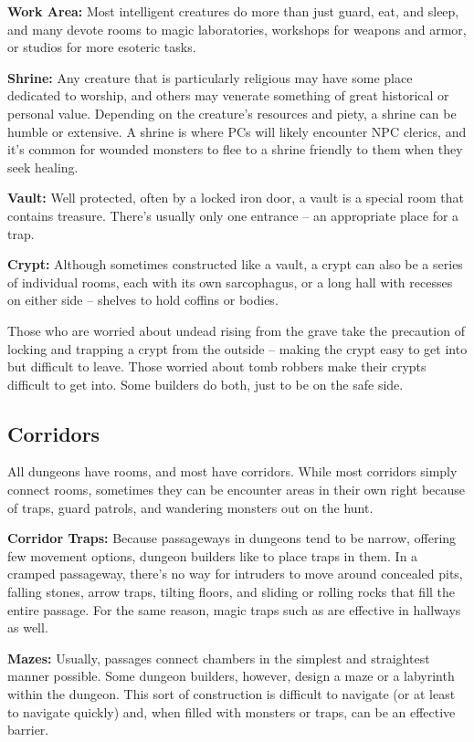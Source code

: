\textbf{Work Area:} Most intelligent creatures do more than just guard, eat, and sleep, and many devote rooms to magic laboratories, workshops for weapons and armor, or studios for more esoteric tasks.

\textbf{Shrine:} Any creature that is particularly religious may have some place dedicated to worship, and others may venerate something of great historical or personal value. Depending on the creature's resources and piety, a shrine can be humble or extensive. A shrine is where PCs will likely encounter NPC clerics, and it's common for wounded monsters to flee to a shrine friendly to them when they seek healing.

\textbf{Vault:} Well protected, often by a locked iron door, a vault is a special room that contains treasure. There's usually only one entrance -- an appropriate place for a trap.

\textbf{Crypt:} Although sometimes constructed like a vault, a crypt can also be a series of individual rooms, each with its own sarcophagus, or a long hall with recesses on either side -- shelves to hold coffins or bodies.

Those who are worried about undead rising from the grave take the precaution of locking and trapping a crypt from the outside -- making the crypt easy to get into but difficult to leave. Those worried about tomb robbers make their crypts difficult to get into. Some builders do both, just to be on the safe side.

\subsection{Corridors}

All dungeons have rooms, and most have corridors. While most corridors simply connect rooms, sometimes they can be encounter areas in their own right because of traps, guard patrols, and wandering monsters out on the hunt.

\textbf{Corridor Traps:} Because passageways in dungeons tend to be narrow, offering few movement options, dungeon builders like to place traps in them. In a cramped passageway, there's no way for intruders to move around concealed pits, falling stones, arrow traps, tilting floors, and sliding or rolling rocks that fill the entire passage. For the same reason, magic traps such as  are effective in hallways as well.

\textbf{Mazes:} Usually, passages connect chambers in the simplest and straightest manner possible. Some dungeon builders, however, design a maze or a labyrinth within the dungeon. This sort of construction is difficult to navigate (or at least to navigate quickly) and, when filled with monsters or traps, can be an effective barrier.

